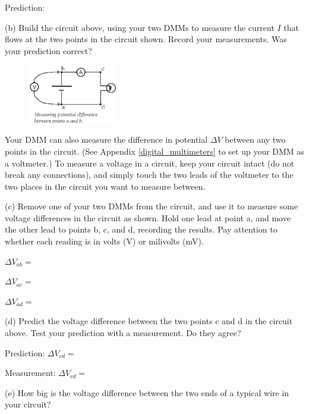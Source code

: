 \vspace{0.2 in}
Prediction:
\vspace{1.0 in}

(b) Build the circuit above, using your two DMMs to measure the current $I$ that flows at the two points in the circuit shown.  Record your measurements.  Was your prediction correct?
\answerspace{0.8 in}

\pagebreak

\begin{figure}
    \includegraphics[width=0.35\textwidth]{electric_circuits/circ_diag2.eps}
\end{figure}
Your DMM can also measure the difference in potential $\Delta V$ between any two points in the circuit.  (See Appendix \ref{digital_multimeters} to set up your DMM as a voltmeter.)  To measure a voltage in a circuit, keep your circuit intact (do not break any connections), and simply touch the two leads of the voltmeter to the two places in the circuit you want to measure between.

(c) Remove one of your two DMMs from the circuit, and use it to measure some voltage differences in the circuit as shown.  Hold one lead at point a, and move the other lead to points b, c, and d, recording the results.  Pay attention to whether each reading is in volts (V) or milivolts (mV).

\vspace{0.1 in}
\hspace{0.5 in} $\Delta V_{ab} = $ \par
\hspace{0.5 in} $\Delta V_{ac} = $ \par
\hspace{0.5 in} $\Delta V_{ad} = $ \par
\vspace{0.2 in}

(d)  Predict the voltage difference between the two points c and d in the circuit above.  Test your prediction with a measurement.  Do they agree? \par
\hspace{0.5 in} Prediction:   $\Delta V_{cd} = $ \par
\vspace{0.2 in}
\hspace{0.5 in} Measurement:   $\Delta V_{cd} = $ \par
\vspace{0.3 in}
(e) How big is the voltage difference between the two ends of a typical wire in your circuit?
\answerspace{0.6 in}



